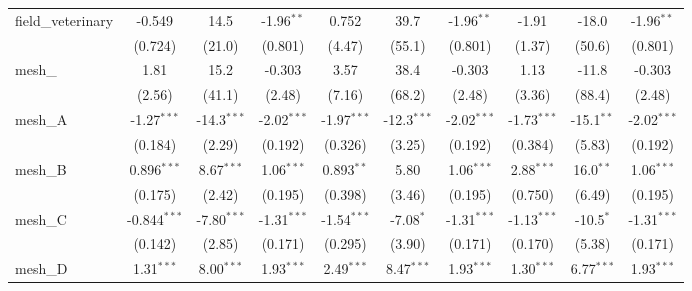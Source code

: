 \begin{tabular}{lccccccccc}
   field\_veterinary                                           & -0.549         & 14.5           & -1.96$^{**}$  & 0.752         & 39.7           & -1.96$^{**}$  & -1.91          & -18.0         & -1.96$^{**}$\\   
                                                               & (0.724)        & (21.0)         & (0.801)       & (4.47)        & (55.1)         & (0.801)       & (1.37)         & (50.6)        & (0.801)\\   
   mesh\_                                                      & 1.81           & 15.2           & -0.303        & 3.57          & 38.4           & -0.303        & 1.13           & -11.8         & -0.303\\   
                                                               & (2.56)         & (41.1)         & (2.48)        & (7.16)        & (68.2)         & (2.48)        & (3.36)         & (88.4)        & (2.48)\\   
   mesh\_A                                                     & -1.27$^{***}$  & -14.3$^{***}$  & -2.02$^{***}$ & -1.97$^{***}$ & -12.3$^{***}$  & -2.02$^{***}$ & -1.73$^{***}$  & -15.1$^{**}$  & -2.02$^{***}$\\   
                                                               & (0.184)        & (2.29)         & (0.192)       & (0.326)       & (3.25)         & (0.192)       & (0.384)        & (5.83)        & (0.192)\\   
   mesh\_B                                                     & 0.896$^{***}$  & 8.67$^{***}$   & 1.06$^{***}$  & 0.893$^{**}$  & 5.80           & 1.06$^{***}$  & 2.88$^{***}$   & 16.0$^{**}$   & 1.06$^{***}$\\   
                                                               & (0.175)        & (2.42)         & (0.195)       & (0.398)       & (3.46)         & (0.195)       & (0.750)        & (6.49)        & (0.195)\\   
   mesh\_C                                                     & -0.844$^{***}$ & -7.80$^{***}$  & -1.31$^{***}$ & -1.54$^{***}$ & -7.08$^{*}$    & -1.31$^{***}$ & -1.13$^{***}$  & -10.5$^{*}$   & -1.31$^{***}$\\   
                                                               & (0.142)        & (2.85)         & (0.171)       & (0.295)       & (3.90)         & (0.171)       & (0.170)        & (5.38)        & (0.171)\\   
   mesh\_D                                                     & 1.31$^{***}$   & 8.00$^{***}$   & 1.93$^{***}$  & 2.49$^{***}$  & 8.47$^{***}$   & 1.93$^{***}$  & 1.30$^{***}$   & 6.77$^{***}$  & 1.93$^{***}$\\   

\end{tabular}
